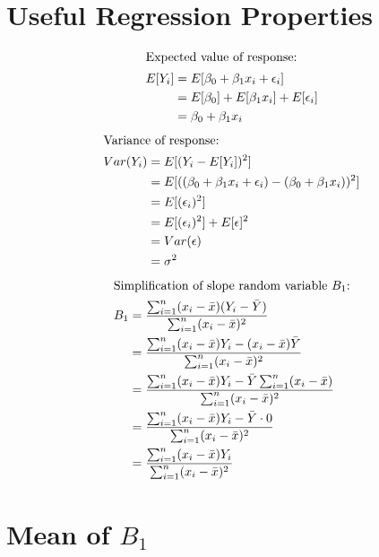 \documentclass{article}
\begin{document}
\section*{Useful Regression Properties}
\begin{align*}
    \intertext{Expected value of response:}
    E[Y_i] & = E[\beta_0 + \beta_1 x_i + \epsilon_i]       \\
           & = E[\beta_0] + E[\beta_1 x_i] + E[\epsilon_i] \\
           & = \beta_0 + \beta_1 x_i
\end{align*}
\begin{align*}
    \intertext{Variance of response:}
    Var(Y_i) & = E[(Y_i - E[Y_i])^2]                                                   \\
             & = E[((\beta_0 + \beta_1 x_i + \epsilon_i) - (\beta_0 + \beta_1 x_i))^2] \\
             & = E[(\epsilon_i)^2]                                                     \\
             & = E[(\epsilon_i)^2] + E[\epsilon]^2                                     \\
             & = Var(\epsilon)                                                         \\
             & = \sigma^2
\end{align*}
\begin{align*}
    \intertext{Simplification of slope random variable $B_1$:}
    B_1 & = \frac{\sum_{i=1}^n (x_i - \bar{x}) (Y_i - \bar{Y})}{\sum_{i=1}^n (x_i - \bar{x})^2}                            \\
        & = \frac{\sum_{i=1}^n (x_i - \bar{x}) Y_i - (x_i - \bar{x}) \bar{Y}}{\sum_{i=1}^n (x_i - \bar{x})^2}              \\
        & = \frac{\sum_{i=1}^n (x_i - \bar{x}) Y_i - \bar{Y} \sum_{i=1}^n (x_i - \bar{x})}{\sum_{i=1}^n (x_i - \bar{x})^2} \\
        & = \frac{\sum_{i=1}^n (x_i - \bar{x}) Y_i - \bar{Y} \cdot 0}{\sum_{i=1}^n (x_i - \bar{x})^2}                      \\
        & = \frac{\sum_{i=1}^n (x_i - \bar{x}) Y_i}{\sum_{i=1}^n (x_i - \bar{x})^2}
\end{align*}

\section*{Mean of $B_1$}
\end{document}
